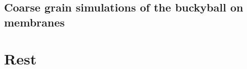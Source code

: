 \subsection{Coarse grain simulations of the buckyball on membranes}


\section{Rest}
%
%
%
%

%
%
%
%
%
%
